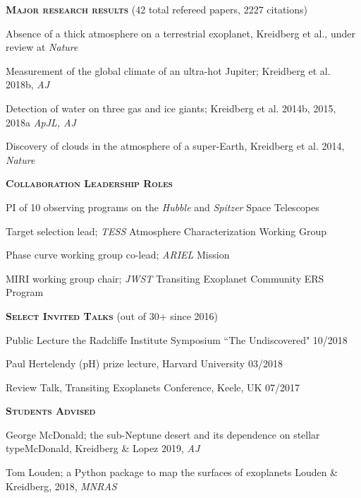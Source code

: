 \documentclass[12pt,letterpaper]{article}
\newcommand\tab[1][1cm]{\hspace*{#1}}
\begin{document}
\textbf{\textsc{Major research results}} (42 total refereed papers, 2227 citations) 
\begin{compactitem}[]

\item Absence of a thick atmosphere on a terrestrial exoplanet, Kreidberg et al., under review at \textit{Nature}

\item Measurement of the global climate of an ultra-hot Jupiter; Kreidberg et al. 2018b, \textit{AJ}

\item Detection of water on three gas and ice giants; Kreidberg et al. 2014b, 2015, 2018a \textit{ApJL, AJ}

\item Discovery of clouds in the atmosphere of a super-Earth, 
Kreidberg et al. 2014, \textit{Nature}
\end{compactitem}
\vspace{5mm}

\textbf{\textsc{Collaboration Leadership Roles}}
\begin{compactitem}[]
\item PI of 10 observing programs on the \emph{Hubble} and \emph{Spitzer} Space Telescopes
\item Target selection lead; \emph{TESS} Atmosphere Characterization Working Group 
\item Phase curve working group co-lead; \emph{ARIEL} Mission 
\item MIRI working group chair; \emph{JWST} Transiting Exoplanet Community ERS Program
\end{compactitem}

\vspace{6mm}
\textbf{\textsc{Select Invited Talks}} (out of 30+ since 2016)
\begin{compactitem}[]
\item {Public Lecture the Radcliffe Institute Symposium ``The Undiscovered" \hfill 10/2018}
\item{Paul Hertelendy (pH) prize lecture, Harvard University \hfill 03/2018}
\item {Review Talk, Transiting Exoplanets Conference, Keele, UK \hfill 07/2017}
\end{compactitem}

\vspace{6mm}
\textbf{\textsc{Students Advised}}
\begin{compactitem}[]
\item George McDonald; the sub-Neptune desert and its dependence on stellar type\newline \tab McDonald, Kreidberg \& Lopez 2019, \textit{AJ}
\item Tom Louden; a Python package to map the surfaces of exoplanets \newline \tab Louden \& Kreidberg, 2018, \textit{MNRAS} 
\end{compactitem}
\end{document}
